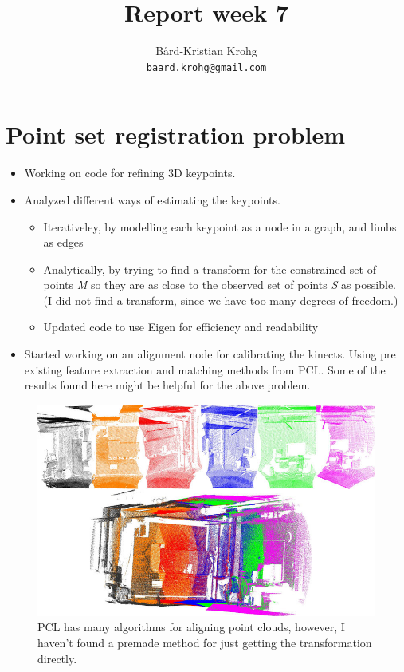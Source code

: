 \documentclass[a4paper]{article}
\title{Report week 7}
\author{Bård-Kristian Krohg \\ \texttt{baard.krohg@gmail.com}}
\begin{document}
\maketitle

\section{Point set registration problem}
\begin{itemize}
\item Working on code for refining 3D keypoints.
\item Analyzed different ways of estimating the keypoints.
  \begin{itemize}
  \item Iterativeley, by modelling each keypoint as a node in a graph, and limbs as edges
  \item Analytically, by trying to find a transform for the constrained set of points \emph{M} so they are as close to the observed set of points \emph{S} as possible. (I did not find a transform, since we have too many degrees of freedom.)
  \item Updated code to use Eigen for efficiency and readability
  \end{itemize}
\item Started working on an alignment node for calibrating the kinects. Using pre existing feature extraction and matching methods from PCL. Some of the results found here might be helpful for the above problem.
\end{itemize}

\begin{figure}[h]
  \centering
  \includegraphics[width=.95\textwidth]{example_iterative_pcl}
  \caption{PCL has many algorithms for aligning point clouds, however, I haven't found a premade method for just getting the transformation directly.}
\end{figure}
\end{document}
